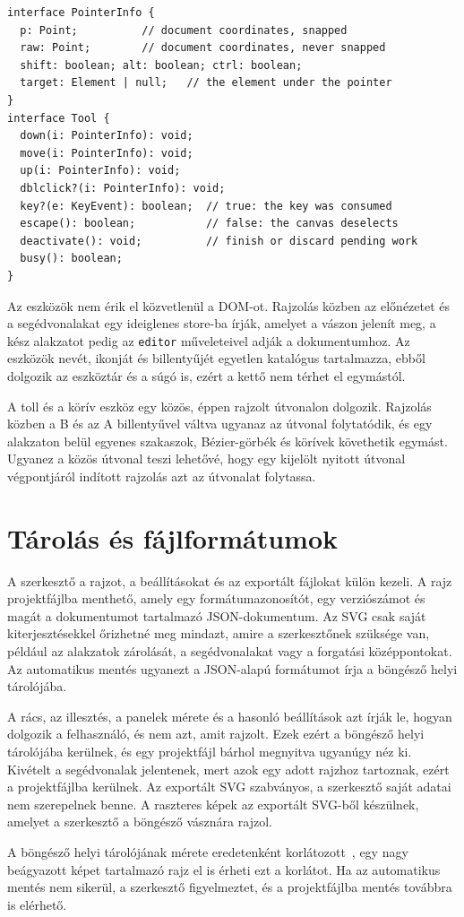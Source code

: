 \begin{lstlisting}[style=TS, caption={Az eszközök közös felülete (\texttt{tools/types.ts}, rövidítve)}, label=lst:tool]
interface PointerInfo {
  p: Point;          // document coordinates, snapped
  raw: Point;        // document coordinates, never snapped
  shift: boolean; alt: boolean; ctrl: boolean;
  target: Element | null;   // the element under the pointer
}
interface Tool {
  down(i: PointerInfo): void;
  move(i: PointerInfo): void;
  up(i: PointerInfo): void;
  dblclick?(i: PointerInfo): void;
  key?(e: KeyEvent): boolean;  // true: the key was consumed
  escape(): boolean;           // false: the canvas deselects
  deactivate(): void;          // finish or discard pending work
  busy(): boolean;
}
\end{lstlisting}

Az eszközök nem érik el közvetlenül a DOM-ot. Rajzolás közben az előnézetet és a segédvonalakat egy ideiglenes store-ba írják, amelyet a vászon jelenít meg, a kész alakzatot pedig az \texttt{editor} műveleteivel adják a dokumentumhoz. Az eszközök nevét, ikonját és billentyűjét egyetlen katalógus tartalmazza, ebből dolgozik az eszköztár és a súgó is, ezért a kettő nem térhet el egymástól.

A toll és a körív eszköz egy közös, éppen rajzolt útvonalon dolgozik. Rajzolás közben a B és az A billentyűvel váltva ugyanaz az útvonal folytatódik, és egy alakzaton belül egyenes szakaszok, Bézier-görbék és körívek követhetik egymást. Ugyanez a közös útvonal teszi lehetővé, hogy egy kijelölt nyitott útvonal végpontjáról indított rajzolás azt az útvonalat folytassa.

\section{Tárolás és fájlformátumok}
\label{sec:storage_design}

A szerkesztő a rajzot, a beállításokat és az exportált fájlokat külön kezeli. A rajz projektfájlba menthető, amely egy formátumazonosítót, egy verziószámot és magát a dokumentumot tartalmazó JSON-dokumentum. Az SVG csak saját kiterjesztésekkel őrizhetné meg mindazt, amire a szerkesztőnek szüksége van, például az alakzatok zárolását, a segédvonalakat vagy a forgatási középpontokat. Az automatikus mentés ugyanezt a JSON-alapú formátumot írja a böngésző helyi tárolójába.

A rács, az illesztés, a panelek mérete és a hasonló beállítások azt írják le, hogyan dolgozik a felhasználó, és nem azt, amit rajzolt. Ezek ezért a böngésző helyi tárolójába kerülnek, és egy projektfájl bárhol megnyitva ugyanúgy néz ki. Kivételt a segédvonalak jelentenek, mert azok egy adott rajzhoz tartoznak, ezért a projektfájlba kerülnek. Az exportált SVG szabványos, a szerkesztő saját adatai nem szerepelnek benne. A raszteres képek az exportált SVG-ből készülnek, amelyet a szerkesztő a böngésző vásznára rajzol.

A böngésző helyi tárolójának mérete eredetenként korlátozott~\cite{mdn-storage, whatwg-webstorage}, egy nagy beágyazott képet tartalmazó rajz el is érheti ezt a korlátot. Ha az automatikus mentés nem sikerül, a szerkesztő figyelmeztet, és a projektfájlba mentés továbbra is elérhető.
